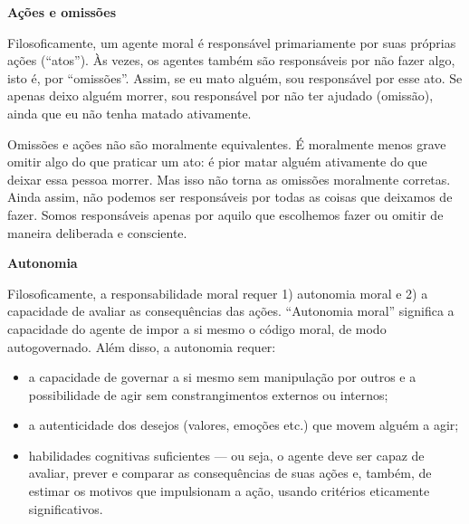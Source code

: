 \documentclass[
  11pt,
]{article}
\providecommand{\tightlist}{%
  \setlength{\itemsep}{0pt}\setlength{\parskip}{0pt}}
\begin{document}
\textbf{Ações e omissões}

Filosoficamente, um agente moral é responsável primariamente por suas
próprias ações (``atos''). Às vezes, os agentes também são responsáveis
por não fazer algo, isto é, por ``omissões''. Assim, se eu mato alguém,
sou responsável por esse ato. Se apenas deixo alguém morrer, sou
responsável por não ter ajudado (omissão), ainda que eu não tenha matado
ativamente.

Omissões e ações não são moralmente equivalentes. É moralmente menos
grave omitir algo do que praticar um ato: é pior matar alguém ativamente
do que deixar essa pessoa morrer. Mas isso não torna as omissões
moralmente corretas. Ainda assim, não podemos ser responsáveis por todas
as coisas que deixamos de fazer. Somos responsáveis apenas por aquilo
que escolhemos fazer ou omitir de maneira deliberada e consciente.

\textbf{Autonomia}

Filosoficamente, a responsabilidade moral requer 1) autonomia moral e 2)
a capacidade de avaliar as consequências das ações. ``Autonomia moral''
significa a capacidade do agente de impor a si mesmo o código moral, de
modo autogovernado. Além disso, a autonomia requer:

\begin{itemize}
\tightlist
\item
  a capacidade de governar a si mesmo sem manipulação por outros e a
  possibilidade de agir sem constrangimentos externos ou internos;
\item
  a autenticidade dos desejos (valores, emoções etc.) que movem alguém a
  agir;
\item
  habilidades cognitivas suficientes --- ou seja, o agente deve ser
  capaz de avaliar, prever e comparar as consequências de suas ações e,
  também, de estimar os motivos que impulsionam a ação, usando critérios
  eticamente significativos.
\end{itemize}
\end{document}
